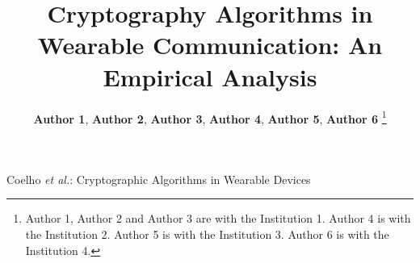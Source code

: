 \documentclass[journal]{IEEEtran}
\begin{document}
\title{Cryptography Algorithms in Wearable %
Communication: An Empirical Analysis}



\author{%
{\bf Author 1}, {\bf Author 2}, %
{\bf Author 3}, %
{\bf Author 4}, %
{\bf Author 5}, {\bf Author 6} \vspace{-0.5cm}%
\thanks{Author 1, Author 2 and Author 3 are with the Institution 1. Author 4 is with the Institution 2. Author 5 is with the Institution 3. Author 6 is with the Institution 4.}
\vspace{-0.3cm}}


%
{Coelho \MakeLowercase{\textit{et al.}}: Cryptographic Algorithms in Wearable Devices}


\maketitle
{}
\end{document}
